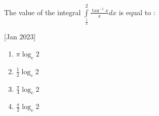     \item The value of the integral $\int\limits_\frac{1}{2}^2\frac{\tan^{-1}x}{x}dx$ is equal to :
    
    \hfill[Jan 2023]
        \begin{enumerate}
            \item $\pi\log_{e}2$
            \item $\frac{1}{2}\log_{e}2$
            \item $\frac{\pi}{4}\log_{e}2$
            \item $\frac{\pi}{2}\log_{e}2$
        \end{enumerate}

